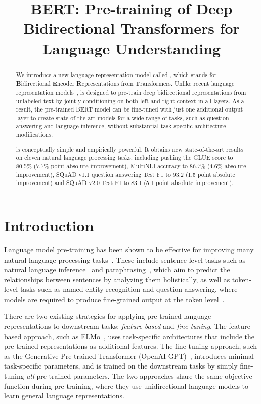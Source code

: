 \title{BERT: Pre-training of Deep Bidirectional Transformers for Language Understanding}

\begin{abstract}
We introduce a new language representation model called {\bf \bert}, which stands for \textbf{B}idirectional \textbf{E}ncoder \textbf{R}epresentations from \textbf{T}ransformers. Unlike recent language representation models~\cite{peters-etal:2018:_deep, radford-etal:2018},  \bert is designed to pre-train deep bidirectional representations from unlabeled text by jointly conditioning on both left and right context in all layers. As a result, the pre-trained BERT model can be fine-tuned with just one additional output layer to create state-of-the-art models for a wide range of tasks, such as question answering and language inference, without substantial task-specific architecture modifications. 

\bert is conceptually simple and empirically powerful. It obtains new state-of-the-art results on eleven natural language processing tasks, including pushing the GLUE score to 80.5\% (7.7\% point absolute improvement), MultiNLI accuracy to 86.7\% (4.6\% absolute improvement), SQuAD v1.1 question answering Test F1 to 93.2 (1.5 point absolute improvement) and SQuAD v2.0 Test F1 to 83.1 (5.1 point absolute improvement).
\end{abstract}

\section{Introduction}

Language model pre-training has been shown to be effective for improving many natural language processing tasks~\cite{dai-le:2015:_semi, peters-etal:2018:_deep, radford-etal:2018, howard-ruder:2018}. These include sentence-level tasks such as natural language inference~\cite{bowman-etal:2015, williams-nangia-bowman:2018} and paraphrasing~\cite{dolan-brockett:2005:_autom}, which aim to predict the relationships between sentences by analyzing them holistically, as well as token-level tasks such as named entity recognition and question answering, where models are required to produce fine-grained output at the token level~\cite{tjong-de:2003, rajpurkar-etal:2016:_squad}.

There are two existing strategies for applying pre-trained language representations to downstream tasks: {\em feature-based} and {\em fine-tuning}. The feature-based approach, such as ELMo~\cite{peters-etal:2018:_deep}, uses task-specific architectures that include the pre-trained representations as additional features. The fine-tuning approach, such as the Generative Pre-trained Transformer (OpenAI GPT)~\cite{radford-etal:2018}, introduces minimal task-specific parameters, and is trained on the downstream tasks by simply fine-tuning {\em all} pre-trained parameters. The two approaches share the same objective function during pre-training, where they use unidirectional language models to learn general language representations.

